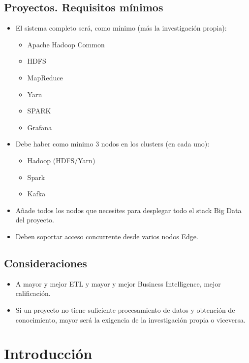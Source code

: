 \documentclass[12pt]{article}
\begin{document}
\subsection{Proyectos. Requisitos mínimos}
\begin{itemize}
  \item El sistema completo será, como mínimo (más la investigación propia):
  \begin{itemize}
    \item Apache Hadoop Common
    \item HDFS
    \item MapReduce
    \item Yarn
    \item SPARK
    \item Grafana
  \end{itemize}
  \item Debe haber como mínimo 3 nodos en los clusters (en cada uno):
  \begin{itemize}
    \item Hadoop (HDFS/Yarn)
    \item Spark
    \item Kafka
  \end{itemize}
  \item Añade todos los nodos que necesites para desplegar todo el stack Big Data del proyecto.
  \item Deben soportar acceso concurrente desde varios nodos Edge.
\end{itemize}

\subsection{Consideraciones}

\begin{itemize}
  \item A mayor y mejor ETL y mayor y mejor Business Intelligence, mejor calificación.
  \item Si un proyecto no tiene suficiente procesamiento de datos y obtención de conocimiento, 
  mayor será la exigencia de la investigación propia o viceversa.
\end{itemize}

\clearpage

\section{Introducción}
\end{document}
